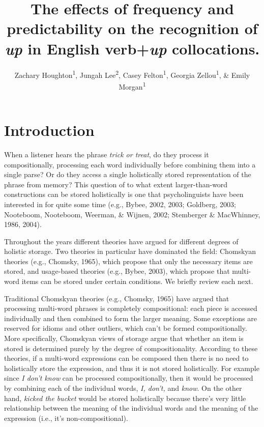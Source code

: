 \documentclass[
  man,floatsintext]{apa6}
\title{The effects of frequency and predictability on the recognition of \emph{up} in English verb+\emph{up} collocations.}
\author{Zachary Houghton\textsuperscript{1}, Jungah Lee\textsuperscript{2}, Casey Felton\textsuperscript{1}, Georgia Zellou\textsuperscript{1}, \& Emily Morgan\textsuperscript{1}}
\date{}
\affiliation{\vspace{0.5cm}\textsuperscript{1} University of California, Davis\\\textsuperscript{2} Chosun University}
\begin{document}
\maketitle

\section{Introduction}\label{introduction}

When a listener hears the phrase \emph{trick or treat}, do they process it compositionally, processing each word individually before combining them into a single parse? Or do they access a single holistically stored representation of the phrase from memory? This question of to what extent larger-than-word constructions can be stored holistically is one that psycholinguists have been interested in for quite some time (e.g., Bybee, 2002, 2003; Goldberg, 2003; Nooteboom, Nooteboom, Weerman, \& Wijnen, 2002; Stemberger \& MacWhinney, 1986, 2004).

Throughout the years different theories have argued for different degrees of holistic storage. Two theories in particular have dominated the field: Chomskyan theories (e.g., Chomsky, 1965), which propose that only the necessary items are stored, and usage-based theories (e.g., Bybee, 2003), which propose that multi-word items can be stored under certain conditions. We briefly review each next.

Traditional Chomskyan theories (e.g., Chomsky, 1965) have argued that processing multi-word phrases is completely compositional: each piece is accessed individually and then combined to form the larger meaning. Some exceptions are reserved for idioms and other outliers, which can't be formed compositionally. More specifically, Chomskyan views of storage argue that whether an item is stored is determined purely by the degree of compositionality. According to these theories, if a multi-word expressions can be composed then there is no need to holistically store the expression, and thus it is not stored holistically. For example since \emph{I don't know} can be processed compositionally, then it would be processed by combining each of the individual words, \emph{I, don't,} and \emph{know}. On the other hand, \emph{kicked the bucket} would be stored holistically because there's very little relationship between the meaning of the individual words and the meaning of the expression (i.e., it's non-compositional).
\end{document}
